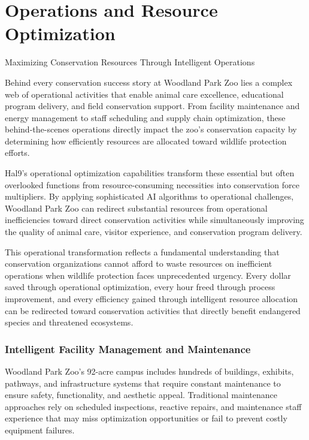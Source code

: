 \documentclass[
  Letterpaper,
]{scrbook}
\begin{document}

\chapter{Operations and Resource
Optimization}\label{operations-and-resource-optimization}

Maximizing Conservation Resources Through Intelligent Operations

\hfill\break

Behind every conservation success story at Woodland Park Zoo lies a
complex web of operational activities that enable animal care
excellence, educational program delivery, and field conservation
support. From facility maintenance and energy management to staff
scheduling and supply chain optimization, these behind-the-scenes
operations directly impact the zoo's conservation capacity by
determining how efficiently resources are allocated toward wildlife
protection efforts.

Hal9's operational optimization capabilities transform these essential
but often overlooked functions from resource-consuming necessities into
conservation force multipliers. By applying sophisticated AI algorithms
to operational challenges, Woodland Park Zoo can redirect substantial
resources from operational inefficiencies toward direct conservation
activities while simultaneously improving the quality of animal care,
visitor experience, and conservation program delivery.

This operational transformation reflects a fundamental understanding
that conservation organizations cannot afford to waste resources on
inefficient operations when wildlife protection faces unprecedented
urgency. Every dollar saved through operational optimization, every hour
freed through process improvement, and every efficiency gained through
intelligent resource allocation can be redirected toward conservation
activities that directly benefit endangered species and threatened
ecosystems.

\subsection{Intelligent Facility Management and
Maintenance}\label{intelligent-facility-management-and-maintenance}

Woodland Park Zoo's 92-acre campus includes hundreds of buildings,
exhibits, pathways, and infrastructure systems that require constant
maintenance to ensure safety, functionality, and aesthetic appeal.
Traditional maintenance approaches rely on scheduled inspections,
reactive repairs, and maintenance staff experience that may miss
optimization opportunities or fail to prevent costly equipment failures.
\end{document}
